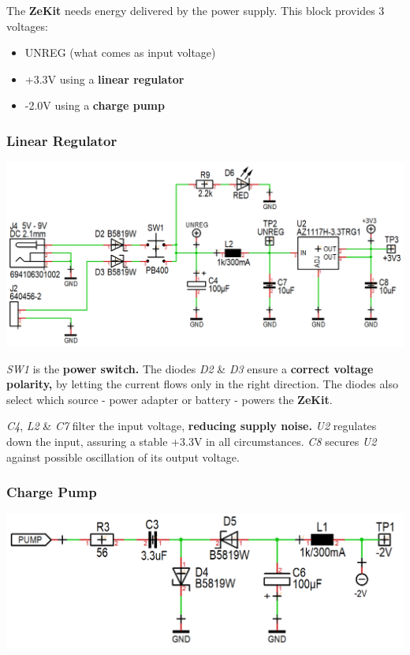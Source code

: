\documentclass{scrartcl}
\begin{document}
The \textbf{ZeKit} needs energy delivered by the power supply. This block provides 3 voltages: 
\begin{itemize}
    \item UNREG (what comes as input voltage)
    \item +3.3V using a \textbf{linear regulator}
    \item -2.0V using a \textbf{charge pump}
\end{itemize}

\subsubsection{Linear Regulator}

\vspace{-0.25cm}
\begin{center}
    \includegraphics[scale=0.42]{assets/schema-power.png}
\end{center}

\emph{SW1} is the \textbf{power switch.} The diodes \emph{D2} \& \emph{D3} ensure a \textbf{correct voltage polarity,} by letting the current flows only in the right direction. The diodes also select which source - power adapter or battery - powers the \textbf{ZeKit}.

\emph{C4}, \emph{L2} \& \emph{C7} filter the input voltage, \textbf{reducing supply noise.} \emph{U2} regulates down the input, assuring a stable +3.3V in all circumstances. \emph{C8} secures \emph{U2} against possible oscillation of its output voltage.

\subsubsection{Charge Pump}

\begin{center}
    \includegraphics[scale=0.3]{assets/schema-pump.png}
\end{center}
\end{document}
